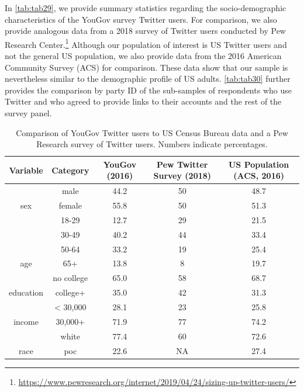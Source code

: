 \documentclass[
  12pt,
]{article}
\begin{document}
In \autoref{tab:tab29}, we provide summary statistics regarding the socio-demographic characteristics of the YouGov survey Twitter users. For comparison, we also provide analogous data from a 2018 survey of Twitter users conducted by Pew Research Center.\footnote{\url{https://www.pewresearch.org/internet/2019/04/24/sizing-up-twitter-users/}} Although our population of interest is US Twitter users and not the general US population, we also provide data from the 2016 American Community Survey (ACS) for comparison. These data show that our sample is nevertheless similar to the demographic profile of US adults. \autoref{tab:tab30} further provides the comparison by party ID of the sub-samples of respondents who use Twitter and who agreed to provide links to their accounts and the rest of the survey panel.

\begin{table}[!h]

\caption{\label{tab:unnamed-chunk-4}\label{tab:tab29}Comparison of YouGov Twitter users to US Census Bureau data and a Pew Research survey of Twitter users. Numbers indicate percentages.}
\centering
\fontsize{10}{12}\selectfont
\begin{tabular}[t]{c|c|c|c|c}
\hline
Variable & Category & YouGov (2016) & Pew Twitter Survey (2018) & US Population (ACS, 2016)\\
\hline
 & male & 44.2 & 50 & 48.7\\

\multirow{-2}{*}{\centering\arraybackslash sex} & female & 55.8 & 50 & 51.3\\

\hline
 & 18-29 & 12.7 & 29 & 21.5\\

 & 30-49 & 40.2 & 44 & 33.4\\

 & 50-64 & 33.2 & 19 & 25.4\\

\multirow{-4}{*}{\centering\arraybackslash age} & 65+ & 13.8 & 8 & 19.7\\

\hline
 & no college & 65.0 & 58 & 68.7\\

\multirow{-2}{*}{\centering\arraybackslash education} & college+ & 35.0 & 42 & 31.3\\

\hline
 & < 30,000 & 28.1 & 23 & 25.8\\

\multirow{-2}{*}{\centering\arraybackslash income} & 30,000+ & 71.9 & 77 & 74.2\\

\hline
 & white & 77.4 & 60 & 72.6\\

\multirow{-2}{*}{\centering\arraybackslash race} & poc & 22.6 & NA & 27.4\\
\hline
\end{tabular}
\end{table}
\end{document}
